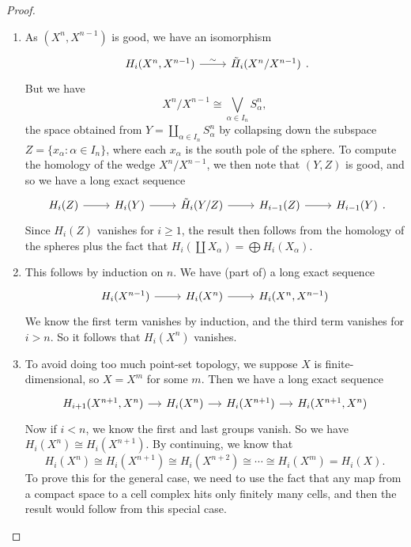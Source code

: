 \documentclass[a4paper]{article}
\theoremstyle{definition}
\begin{document}
\begin{proof}\leavevmode
  \begin{enumerate}
    \item As $(X^n, X^{n - 1})$ is good, we have an isomorphism
      \[
        \begin{tikzcd}
          H_i(X^n, X^{n - 1}) \ar[r, "\sim"] & \tilde{H}_i(X^n/X^{n - 1})
        \end{tikzcd}.
      \]
      But we have
      \[
        X^n/X^{n - 1} \cong \bigvee_{\alpha \in I_n} S_\alpha^n,
      \]
      the space obtained from $Y = \coprod_{\alpha \in I_n}S_\alpha^n$ by collapsing down the subspace $Z = \{x_\alpha: \alpha \in I_n\}$, where each $x_\alpha$ is the south pole of the sphere. To compute the homology of the wedge $X^n/X^{n - 1}$, we then note that $(Y, Z)$ is good, and so we have a long exact sequence
      \[
        \begin{tikzcd}
          H_i(Z) \ar[r] & H_i(Y) \ar[r] & \tilde{H}_i(Y/Z) \ar[r] & H_{i - 1}(Z) \ar[r] & H_{i - 1}(Y)
        \end{tikzcd}.
      \]
      Since $H_i(Z)$ vanishes for $i \geq 1$, the result then follows from the homology of the spheres plus the fact that $H_i(\coprod X_\alpha) = \bigoplus H_i(X_\alpha)$.
    \item This follows by induction on $n$. We have (part of) a long exact sequence
      \[
        \begin{tikzcd}
          H_i(X^{n - 1}) \ar[r] & H_i(X^n) \ar[r] & H_i(X^n, X^{n - 1})
        \end{tikzcd}
      \]
      We know the first term vanishes by induction, and the third term vanishes for $i > n$. So it follows that $H_i(X^n)$ vanishes.
    \item To avoid doing too much point-set topology, we suppose $X$ is finite-dimensional, so $X = X^m$ for some $m$. Then we have a long exact sequence
      \[
        \begin{tikzcd}[column sep=small]
          H_{i + 1} (X^{n + 1}, X^n) \ar[r] & H_i(X^n) \ar[r] & H_i(X^{n + 1}) \ar[r] & H_i(X^{n + 1}, X^n)
        \end{tikzcd}
      \]
      Now if $i < n$, we know the first and last groups vanish. So we have $H_i(X^n) \cong H_i(X^{n + 1})$. By continuing, we know that
      \[
        H_i(X^n) \cong H_i(X^{n + 1}) \cong H_i(X^{n + 2}) \cong \cdots \cong H_i(X^m) = H_i(X).
      \]
      To prove this for the general case, we need to use the fact that any map from a compact space to a cell complex hits only finitely many cells, and then the result would follow from this special case.
  \end{enumerate}
\end{proof}
\end{document}
